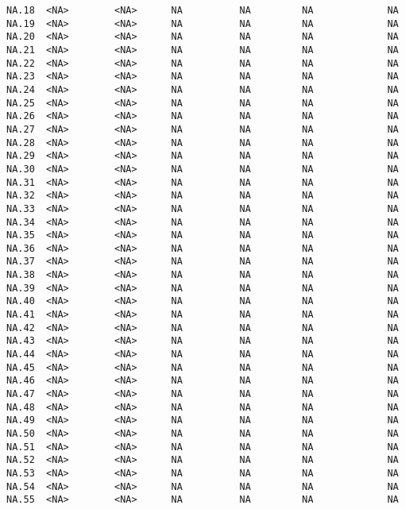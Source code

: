 \documentclass[
  letterpaper,
  DIV=11,
  numbers=noendperiod]{scrartcl}
\begin{document}
\begin{verbatim}
NA.18  <NA>        <NA>      NA          NA         NA             NA
NA.19  <NA>        <NA>      NA          NA         NA             NA
NA.20  <NA>        <NA>      NA          NA         NA             NA
NA.21  <NA>        <NA>      NA          NA         NA             NA
NA.22  <NA>        <NA>      NA          NA         NA             NA
NA.23  <NA>        <NA>      NA          NA         NA             NA
NA.24  <NA>        <NA>      NA          NA         NA             NA
NA.25  <NA>        <NA>      NA          NA         NA             NA
NA.26  <NA>        <NA>      NA          NA         NA             NA
NA.27  <NA>        <NA>      NA          NA         NA             NA
NA.28  <NA>        <NA>      NA          NA         NA             NA
NA.29  <NA>        <NA>      NA          NA         NA             NA
NA.30  <NA>        <NA>      NA          NA         NA             NA
NA.31  <NA>        <NA>      NA          NA         NA             NA
NA.32  <NA>        <NA>      NA          NA         NA             NA
NA.33  <NA>        <NA>      NA          NA         NA             NA
NA.34  <NA>        <NA>      NA          NA         NA             NA
NA.35  <NA>        <NA>      NA          NA         NA             NA
NA.36  <NA>        <NA>      NA          NA         NA             NA
NA.37  <NA>        <NA>      NA          NA         NA             NA
NA.38  <NA>        <NA>      NA          NA         NA             NA
NA.39  <NA>        <NA>      NA          NA         NA             NA
NA.40  <NA>        <NA>      NA          NA         NA             NA
NA.41  <NA>        <NA>      NA          NA         NA             NA
NA.42  <NA>        <NA>      NA          NA         NA             NA
NA.43  <NA>        <NA>      NA          NA         NA             NA
NA.44  <NA>        <NA>      NA          NA         NA             NA
NA.45  <NA>        <NA>      NA          NA         NA             NA
NA.46  <NA>        <NA>      NA          NA         NA             NA
NA.47  <NA>        <NA>      NA          NA         NA             NA
NA.48  <NA>        <NA>      NA          NA         NA             NA
NA.49  <NA>        <NA>      NA          NA         NA             NA
NA.50  <NA>        <NA>      NA          NA         NA             NA
NA.51  <NA>        <NA>      NA          NA         NA             NA
NA.52  <NA>        <NA>      NA          NA         NA             NA
NA.53  <NA>        <NA>      NA          NA         NA             NA
NA.54  <NA>        <NA>      NA          NA         NA             NA
NA.55  <NA>        <NA>      NA          NA         NA             NA

\end{verbatim}
\end{document}
